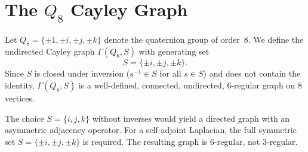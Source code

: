 \section{The $Q_8$ Cayley Graph}
  \label{sec:q8-}

  Let $Q_8 = \{{\pm 1, \pm i, \pm j, \pm k}\}$ denote the quaternion group of order~8.
  We define the undirected Cayley graph $\Gamma(Q_8, S)$ with generating set
  \begin{equation}
    S = \{\pm i, \pm j, \pm k\}.
  \end{equation}
  Since $S$ is closed under inversion ($s^{-1} \in S$ for all $s \in S$) and does
  not contain the identity, $\Gamma(Q_8, S)$ is a well-defined, connected, undirected,
  $6$-regular graph on $8$ vertices.

  \begin{remark}
    The choice $S = \{i, j, k\}$ without inverses would yield a directed graph with an
    asymmetric adjacency operator.
    For a self-adjoint Laplacian, the full symmetric set
    $S = \{\pm i, \pm j, \pm k\}$ is required.
    The resulting graph is $6$-regular, not $3$-regular.
  \end{remark}

  
